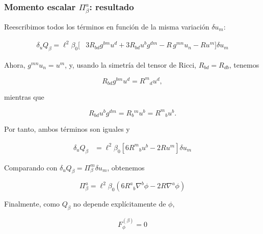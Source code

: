 \documentclass{beamer}
\newcommand{\CompactDisplaySpacing}{%
  \setlength{\abovedisplayskip}{2pt plus 1pt minus 1pt}%
  \setlength{\belowdisplayskip}{2pt plus 1pt minus 1pt}%
  \setlength{\abovedisplayshortskip}{0pt plus 1pt}%
  \setlength{\belowdisplayshortskip}{1pt plus 1pt}%
}
\begin{document}
\begin{frame}[label=nav-frame-107]
\frametitle{Momento escalar \(\Pi_\beta^a\): resultado}
\scriptsize
\CompactDisplaySpacing

Reescribimos todos los términos en función de la misma
variación \(\delta u_m\):

\begin{align*}
\delta_u Q_\beta
=
\ell^2\beta_0
\Big[
&3R_{bd}g^{bm}u^d
+
3R_{bd}u^b g^{dm}
-
R\,g^{mn}u_n
-
Ru^m
\Big]\delta u_m
\end{align*}


Ahora, $g^{mn}u_n=u^m$, y, usando la simetría del tensor de Ricci, $R_{bd}=R_{db}$, tenemos

\[
R_{bd}g^{bm}u^d
=
R^m{}_d u^d,
\]

mientras que

\[
R_{bd}u^b g^{dm}
=
R_b{}^m u^b
=
R^m{}_b u^b.
\]

Por tanto, ambos términos son iguales y

\begin{align*}
\delta_u Q_\beta
&=
\ell^2\beta_0
\left[
6R^m{}_b u^b
-
2Ru^m
\right]\delta u_m
\end{align*}


Comparando con $\delta_u Q_\beta = \Pi_\beta^m\delta u_m$, obtenemos

\begin{equation}
\boxed{
\Pi_\beta^a
=
\ell^2\beta_0
\left(
6R^a{}_b\nabla^b\phi
-
2R\nabla^a\phi
\right)
}
\label{eq:Jbeta}
\end{equation}

Finalmente, como \(Q_\beta\) no depende explícitamente de \(\phi\),

\begin{equation}
\boxed{
F_\phi^{(\beta)} = 0
}
\label{eq:Fbeta}
\end{equation}

\end{frame}
\end{document}
